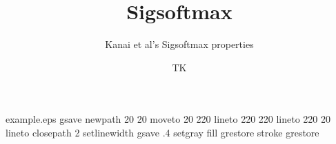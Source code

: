 %
%
%
%
%
\begin{filecontents*}{example.eps}
gsave
newpath
  20 20 moveto
  20 220 lineto
  220 220 lineto
  220 20 lineto
closepath
2 setlinewidth
gsave
  .4 setgray fill
grestore
stroke
grestore
\end{filecontents*}
%
\RequirePackage{fix-cm}
%
\documentclass[smallextended]{svjour3}       %
%
\smartqed  %
%
\usepackage{graphicx}
%
%
%
%
%


\title{Sigsoftmax%
}
\subtitle{Kanai et al's Sigsoftmax properties}


\author{TK}


\maketitle

